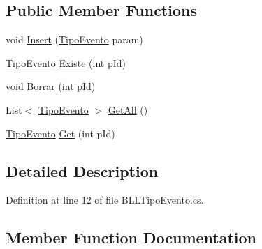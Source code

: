 \subsection*{Public Member Functions}
\begin{DoxyCompactItemize}
\item 
void \hyperlink{classprj_progra_i_i_i_1_1_layer_1_1_business___logic_1_1_b_l_l_tipo_evento_a3edf9ef41a8df3294c6765b55338a750}{Insert} (\hyperlink{classprj_progra_i_i_i_1_1_layer_1_1_entities_1_1_tipo_evento}{Tipo\+Evento} param)
\item 
\hyperlink{classprj_progra_i_i_i_1_1_layer_1_1_entities_1_1_tipo_evento}{Tipo\+Evento} \hyperlink{classprj_progra_i_i_i_1_1_layer_1_1_business___logic_1_1_b_l_l_tipo_evento_a19a88b8e91a1e842f44708080b09f8c5}{Existe} (int p\+Id)
\item 
void \hyperlink{classprj_progra_i_i_i_1_1_layer_1_1_business___logic_1_1_b_l_l_tipo_evento_aaaccacb75f0020bbedee9a98c79d4899}{Borrar} (int p\+Id)
\item 
List$<$ \hyperlink{classprj_progra_i_i_i_1_1_layer_1_1_entities_1_1_tipo_evento}{Tipo\+Evento} $>$ \hyperlink{classprj_progra_i_i_i_1_1_layer_1_1_business___logic_1_1_b_l_l_tipo_evento_a37e2d53e8cc54bfcdd0f3a89caad53cc}{Get\+All} ()
\item 
\hyperlink{classprj_progra_i_i_i_1_1_layer_1_1_entities_1_1_tipo_evento}{Tipo\+Evento} \hyperlink{classprj_progra_i_i_i_1_1_layer_1_1_business___logic_1_1_b_l_l_tipo_evento_ad78fc8f36ab176729080a6720f1627d5}{Get} (int p\+Id)
\end{DoxyCompactItemize}


\subsection{Detailed Description}


Definition at line 12 of file B\+L\+L\+Tipo\+Evento.\+cs.



\subsection{Member Function Documentation}
\hypertarget{classprj_progra_i_i_i_1_1_layer_1_1_business___logic_1_1_b_l_l_tipo_evento_aaaccacb75f0020bbedee9a98c79d4899}{}\label{classprj_progra_i_i_i_1_1_layer_1_1_business___logic_1_1_b_l_l_tipo_evento_aaaccacb75f0020bbedee9a98c79d4899} 
